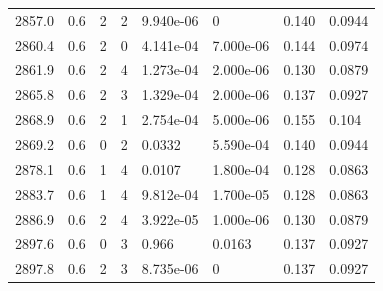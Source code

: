 \documentclass[preview]{standalone}
\begin{document}
{{{{{{{{{{{\begin{tabular}{L{1.2cm}C{1.2cm} C{0.3cm}C{0.5cm} C{1.4cm}C{1.4cm} C{1.4cm}C{1.4cm}}
  2857.0  &   0.6  & 2     &  2 &  9.940e-06  & 0  & 0.140 &  0.0944   \\ 
  2860.4  &   0.6  & 2     &  0 &  4.141e-04  & 7.000e-06  & 0.144 &  0.0974   \\ 
  2861.9  &   0.6  & 2     &  4 &  1.273e-04  & 2.000e-06  & 0.130 &  0.0879   \\ 
  2865.8  &   0.6  & 2     &  3 &  1.329e-04  & 2.000e-06  & 0.137 &  0.0927   \\ 
  2868.9  &   0.6  & 2     &  1 &  2.754e-04  & 5.000e-06  & 0.155 &  0.104   \\ 
  2869.2  &   0.6  & 0     &  2 &  0.0332  & 5.590e-04  & 0.140 &  0.0944   \\ 
  2878.1  &   0.6  & 1     &  4 &  0.0107  & 1.800e-04  & 0.128 &  0.0863   \\ 
  2883.7  &   0.6  & 1     &  4 &  9.812e-04  & 1.700e-05  & 0.128 &  0.0863   \\ 
  2886.9  &   0.6  & 2     &  4 &  3.922e-05  & 1.000e-06  & 0.130 &  0.0879   \\ 
  2897.6  &   0.6  & 0     &  3 &  0.966  & 0.0163  & 0.137 &  0.0927   \\ 
  2897.8  &   0.6  & 2     &  3 &  8.735e-06  & 0  & 0.137 &  0.0927   \\ 
\hline 
\end{tabular} 

}}}}}}}}}}}
\end{document}
